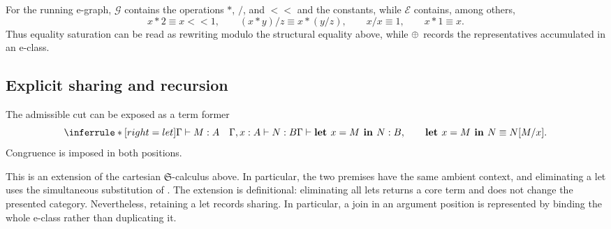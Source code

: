 For the running e-graph, $\mathcal G$ contains the operations $*$, $/$, and $<\!\!<$ and the constants, while $\mathcal E$ contains, among others,
\[
x*2\equiv x<\!\!<1,
\qquad
(x*y)/z\equiv x*(y/z),
\qquad
x/x\equiv1,
\qquad
x*1\equiv x.
\]
Thus equality saturation can be read as rewriting modulo the structural equality above, while $\mathbin{\oplus}$ records the representatives accumulated in an e-class.

\subsection{Explicit sharing and recursion}

\begin{definition}
\label{def:explicit_sharing}
The admissible cut can be exposed as a term former
\[
\inferrule*[right=let]
{\Gamma\vdash M:A\quad\Gamma,x:A\vdash N:B}
{\Gamma\vdash
 \textbf{let }x=M\textbf{ in }N:B},
\qquad
\textbf{let }x=M\textbf{ in }N\equiv N[M/x].
\]
Congruence is imposed in both positions.
\end{definition}
This is an extension of the cartesian $\mathfrak S$-calculus above.  In
particular, the two premises have the same ambient context, and eliminating a
let uses the simultaneous substitution of
.  The extension is definitional:
eliminating all lets returns a core term and does not change the presented
category.  Nevertheless, retaining a let records sharing.  In particular, a
join in an argument position is represented by binding the whole e-class
rather than duplicating it.

